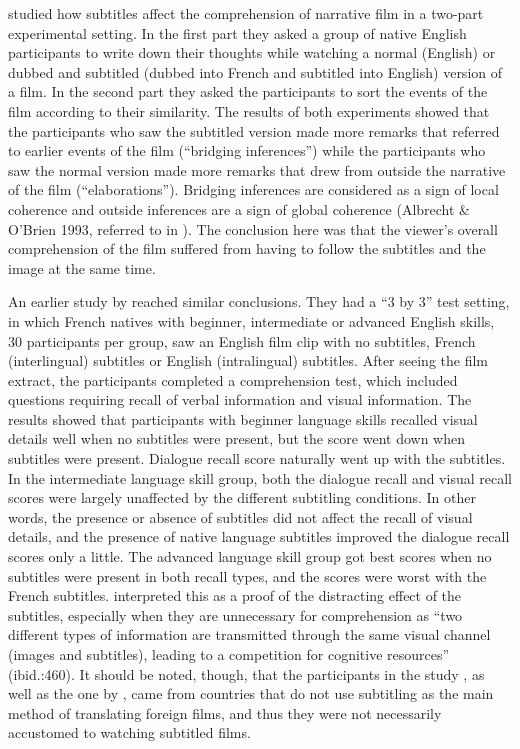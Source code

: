 \documentclass[output=paper]{langsci/langscibook}
\begin{document}
\citet{lee2013} studied how subtitles affect the comprehension of narrative film in a two-part experimental setting. In the first part they asked a group of native English participants to write down their thoughts while watching a normal (English) or dubbed and subtitled (dubbed into French and subtitled into English) version of a film. In the second part they asked the participants to sort the events of the film according to their similarity. The results of both experiments showed that the participants who saw the subtitled version made more remarks that referred to earlier events of the film (“bridging inferences”) while the participants who saw the normal version made more remarks that drew from outside the narrative of the film (“elaborations”). Bridging inferences are considered as a sign of local coherence and outside inferences are a sign of global coherence (Albrecht \& O’Brien 1993, referred to in \citet{lee2013}). The conclusion here was that the viewer’s overall comprehension of the film suffered from having to follow the subtitles and the image at the same time.

An earlier study by \citet{lavaur2011} reached similar conclusions. They had a “3 by 3” test setting, in which French natives with beginner, intermediate or advanced English skills, 30 participants per group, saw an English film clip with no subtitles, French (interlingual) subtitles or English (intralingual) subtitles. After seeing the film extract, the participants completed a comprehension test, which included questions requiring recall of verbal information and visual information. The results showed that participants with beginner language skills recalled visual details well when no subtitles were present, but the score went down when subtitles were present. Dialogue recall score naturally went up with the subtitles. In the intermediate language skill group, both the dialogue recall and visual recall scores were largely unaffected by the different subtitling conditions. In other words, the presence or absence of subtitles did not affect the recall of visual details, and the presence of native language subtitles improved the dialogue recall scores only a little. The advanced language skill group got best scores when no subtitles were present in both recall types, and the scores were worst with the French subtitles. \citet{lavaur2011} interpreted this as a proof of the distracting effect of the subtitles, especially when they are unnecessary for comprehension as “two different types of information are transmitted through the same visual channel (images and subtitles), leading to a competition for cognitive resources” (ibid.:460). It should be noted, though, that the participants in the study \citet{lavaur2011}, as well as the one by \citet{lee2013}, came from countries that do not use subtitling as the main method of translating foreign films, and thus they were not necessarily accustomed to watching subtitled films. 
\end{document}
